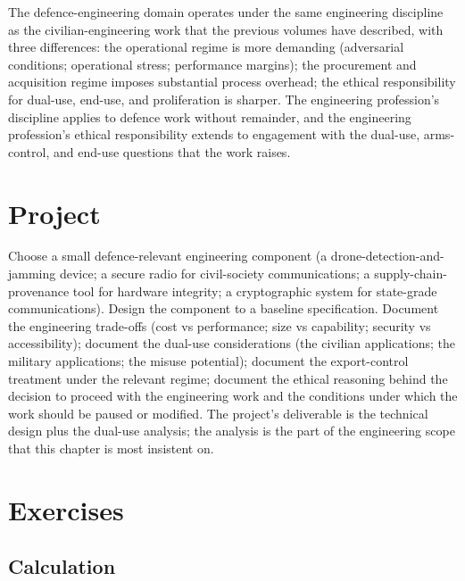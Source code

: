 \begin{principle}
The defence-engineering domain operates under the same engineering discipline as the civilian-engineering work that the previous volumes have described, with three differences: the operational regime is more demanding (adversarial conditions; operational stress; performance margins); the procurement and acquisition regime imposes substantial process overhead; the ethical responsibility for dual-use, end-use, and proliferation is sharper. The engineering profession's discipline applies to defence work without remainder, and the engineering profession's ethical responsibility extends to engagement with the dual-use, arms-control, and end-use questions that the work raises.
\end{principle}

\section{Project}

\begin{project}
Choose a small defence-relevant engineering component (a drone-detection-and-jamming device; a secure radio for civil-society communications; a supply-chain-provenance tool for hardware integrity; a cryptographic system for state-grade communications). Design the component to a baseline specification. Document the engineering trade-offs (cost vs performance; size vs capability; security vs accessibility); document the dual-use considerations (the civilian applications; the military applications; the misuse potential); document the export-control treatment under the relevant regime; document the ethical reasoning behind the decision to proceed with the engineering work and the conditions under which the work should be paused or modified. The project's deliverable is the technical design plus the dual-use analysis; the analysis is the part of the engineering scope that this chapter is most insistent on.
\end{project}

\section{Exercises}

\subsection*{Calculation}

